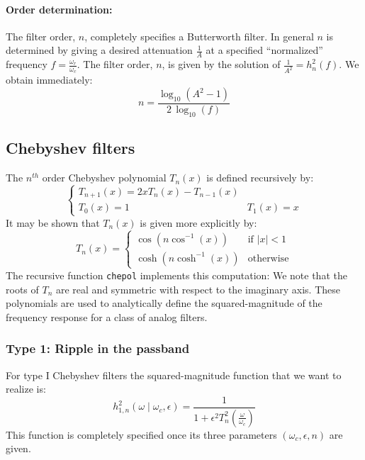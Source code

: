 \paragraph{Order determination:}
The filter order, $n$, completely specifies a Butterworth filter.  In general $n$ is determined by giving a desired attenuation $\frac{1}{A}$ at a specified ``normalized'' frequency $f=\frac{\omega_r}{\omega_c}$.
The filter order, $n$, is given by the solution of $\frac{1}{A^2}=h_n^2(f)$. We obtain immediately: 
\begin{equation}
n=\frac{\log_{10}(A^2-1)}{2\,\log_{10}(f)}
\end{equation}

\subsection{Chebyshev filters}

The $n^{th}$ order Chebyshev polynomial $T_{n}(x)$ is defined recursively by:
$$\left\{
\begin{array}{ll}
T_{n+1}(x)=2xT_{n}(x)-T_{n-1}(x) & \\
T_{0}(x)=1 & T_1(x)=x
\end{array}
\right .$$
It may be shown that $T_{n}(x)$ is given more explicitly by:
\begin{equation}
T_{n}(x) = \left\{
\begin{array}{ll}
 \cos(n \cos^{-1}(x)) & \mbox{if $|x| < 1$} \\
 \cosh(n \cosh^{-1}(x)) & \mbox{otherwise}
\end{array}
\right . 
\label{expli}
\end{equation}
The recursive function {\tt chepol} implements this computation:
We note that the roots of $T_n$ are real and symmetric with respect
to the imaginary axis.
These polynomials are used to analytically define the squared-magnitude of the frequency response for a class of  analog filters.

\subsubsection{Type 1: Ripple in the passband}

For type I Chebyshev filters the squared-magnitude function that we want to realize is:
\begin{equation}
 h_{1,n}^2(\omega \mid \omega_c , \epsilon)=\frac{1}{1+\epsilon^2 T_{n}^2(
\frac{\omega}{\omega_c})}
\label{eqch1}
\end{equation}
This function is completely specified once its three parameters $(\omega_c,\epsilon,n)$ are given.

